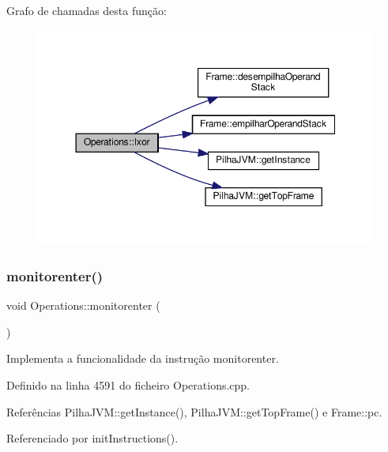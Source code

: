 Grafo de chamadas desta função\+:
\nopagebreak
\begin{figure}[H]
\begin{center}
\leavevmode
\includegraphics[width=350pt]{classOperations_ac135e723f1ac6a27c736e6b8e7d06a45_cgraph}
\end{center}
\end{figure}
\mbox{\label{classOperations_a4d62d66d9e60667ed4e689cd6a44ecaa}} 
\subsubsection{\texorpdfstring{monitorenter()}{monitorenter()}}
{\footnotesize\ttfamily void Operations\+::monitorenter (\begin{DoxyParamCaption}{ }\end{DoxyParamCaption})\hspace{0.3cm}{\ttfamily [private]}}



Implementa a funcionalidade da instrução monitorenter. 



Definido na linha 4591 do ficheiro Operations.\+cpp.



Referências Pilha\+J\+V\+M\+::get\+Instance(), Pilha\+J\+V\+M\+::get\+Top\+Frame() e Frame\+::pc.



Referenciado por init\+Instructions().

